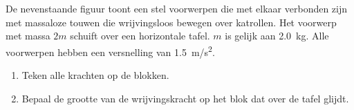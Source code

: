 
\begin{exercise}




\begin{minipage}[t]{.6\linewidth}
	 De nevenstaande figuur toont een stel voorwerpen die met elkaar verbonden zijn met massaloze touwen die wrijvingsloos bewegen over katrollen. Het voorwerp met massa $2m$ schuift over een horizontale tafel. $m$ is gelijk aan \SI{2,0}{kg}. Alle voorwerpen hebben een versnelling van \SI{1,5}{m/s^2}. 
\end{minipage}
\hfill
\begin{minipage}[t]{.37\linewidth}
\end{minipage}

\begin{enumerate}
	\item Teken alle krachten op de blokken.
	\item Bepaal de grootte van de wrijvingskracht op het blok dat over de tafel glijdt.
\end{enumerate}



\begin{oplossing}
	
\end{oplossing}

\end{exercise}

